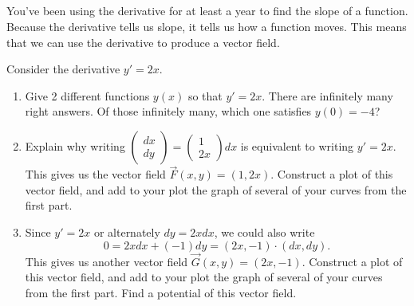 \subsection*{\ideaB}


You've been using the derivative for at least a year to find the slope of a function. Because the derivative tells us slope, it tells us how a function moves.  This means that we can use the derivative to produce a vector field. 

\begin{problem}
Consider the derivative $y'=2x$.  
\begin{enumerate}
 \item Give 2 different functions $y(x)$ so that $y'=2x$. There are infinitely many right answers.  Of those infinitely many, which one satisfies $y(0)=-4$?
 \item Explain why writing
$\begin{pmatrix}
  dx\\dy  
 \end{pmatrix}
 =
\begin{pmatrix}
  1\\2x  
 \end{pmatrix}
dx$ is equivalent to writing $y'=2x$.  This gives us the vector field $\vec F(x,y) = (1,2x)$.  Construct a plot of this vector field, and add to your plot the graph of several of your curves from the first part. 
 \item Since $y'=2x$ or alternately $dy = 2x dx$, we could also write $$0=2xdx+(-1)dy = (2x,-1)\cdot (dx,dy).$$ This gives us another vector field $\vec G(x,y) = (2x,-1)$.  
 Construct a plot of this vector field, and add to your plot the graph of several of your curves from the first part. 
 Find a potential of this vector field. 
\end{enumerate}

\end{problem}


